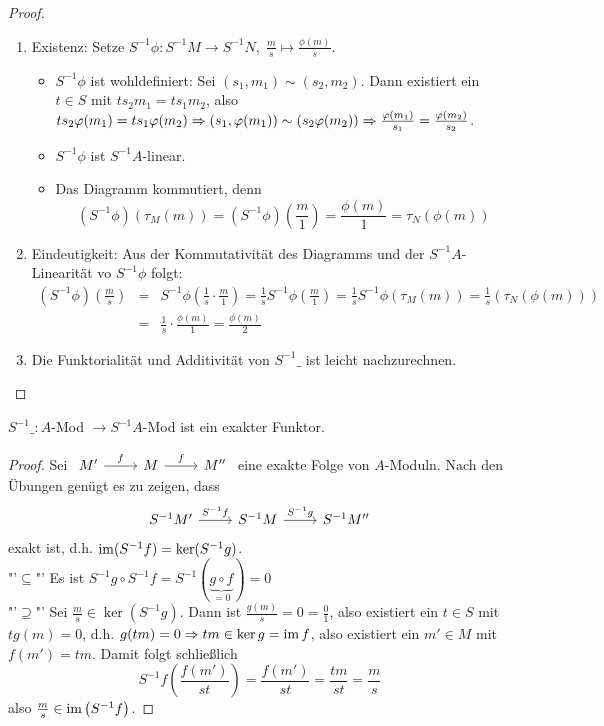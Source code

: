\begin{proof}
	\begin{enumerate}
		\item Existenz: Setze $S^{-1}\phi:S^{-1}M \to S^{-1}N, \; \frac{m}{s} \mapsto \frac{\phi(m)}{s}$.
		\begin{itemize}
			\item $S^{-1}\phi$ ist wohldefiniert: Sei $(s_1,m_1) \sim (s_2, m_2)$. Dann existiert ein $t\in S$ mit $ts_2m_1 = ts_1m_2$, also 
			$ts_2\varphi(m_1) = ts_1\varphi(m_2)\Rightarrow (s_1, \varphi(m_1)) \sim (s_2\varphi(m_2)) \Rightarrow \frac{\varphi(m_1)}{s_1} = \frac{\varphi(m_2)}{s_2}$. 
			\item $S^{-1}\phi$ ist $S^{-1}A$-linear.
			\item Das Diagramm kommutiert, denn 
			$$(S^{-1}\phi)(\tau_M(m)) = (S^{-1}\phi)\left(\frac{m}{1}\right) = \frac{\phi(m)}{1} = \tau_N(\phi(m))$$
		\end{itemize}
		\item Eindeutigkeit: Aus der Kommutativität des Diagramms und der $S^{-1}A$-Linearität vo $S^{-1}\phi$ folgt:
		\begin{eqnarray*}
			(S^{-1}\phi)\left(\frac{m}{s}\right) &=& S^{-1}\phi\left(\frac{1}{s} \cdot \frac{m}{1}\right) = \frac{1}{s} S^{-1}\phi\left(\frac{m}{1}\right) = \frac{1}{s}S^{-1}\phi(\tau_M(m)) = \frac{1}{s} (\tau_N(\phi(m)))\\
			&=& \frac{1}{s} \cdot \frac{\phi(m)}{1} = \frac{\phi(m)}{2}
		\end{eqnarray*}
		\item Die Funktorialität und Additivität von $S^{-1}\_$ ist leicht nachzurechnen.
	\end{enumerate}
\end{proof}
\begin{sa}\label{12.8}
	$S^{-1}\_:A$-Mod $\longrightarrow S^{-1}A$-Mod ist ein exakter Funktor.
\end{sa}
\begin{proof}
	Sei $\begin{tikzcd}
	M' \arrow{r}{f} & M \arrow{r}{f} & M''
	\end{tikzcd}$ eine exakte Folge von $A$-Moduln. Nach den Übungen genügt es zu zeigen, dass 
	$$\begin{tikzcd}
	S^{-1}M' \arrow{r}{S^{-1}f} & S^{-1}M \arrow{r}{S^{-1}g} & S^{-1}M''
\end{tikzcd}$$
exakt ist, d.h. $\operatorname{im}(S^{-1}f) = \ker(S^{-1}g)$.\\
"'$\subseteq$"' Es ist $S^{-1}g\circ S^{-1}f = S^{-1}(\underbrace{g\circ f}_{=0}) = 0$\\
"'$\supseteq$"' Sei $\frac{m}{s} \in \ker(S^{-1}g)$. Dann ist $\frac{g(m)}{s} = 0 = \frac{0}{1}$, also existiert ein $t\in S$ mit $tg(m) = 0$, d.h. $g(tm) = 0 \Rightarrow tm\in \ker g = \operatorname{im} f$, also existiert ein $m'\in M$ mit $f(m') = tm$. Damit folgt schließlich
$$S^{-1}f\left(\frac{f(m')}{st} \right) = \frac{f(m')}{st} = \frac{tm}{st} = \frac{m}{s}$$
also $\frac{m}{s} \in \operatorname{im} \left(S^{-1}f\right)$.
\end{proof}
